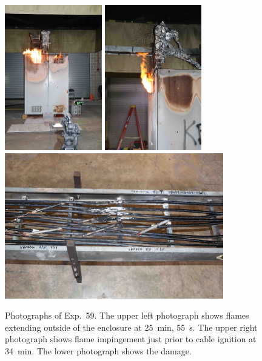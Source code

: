 \begin{figure}[p]
\centering
\includegraphics[height=2.50in,angle=-90]{../FIGURES/Test_59_25_min_55_s} \hspace{0.1in}
\includegraphics[height=2.50in,angle=-90]{../FIGURES/Test_59_side} \\ \vspace{0.1in}
\includegraphics[height=2.50in]{../FIGURES/Test_59_scar}
\caption[Photographs of Exp.~59]{Photographs of Exp.~59. The upper left photograph shows flames extending outside of the enclosure at 25~min, 55~s. The upper right photograph shows flame impingement just prior to cable ignition at 34~min. The lower photograph shows the damage.}
\label{fig:Test_59_photos}
\end{figure}


